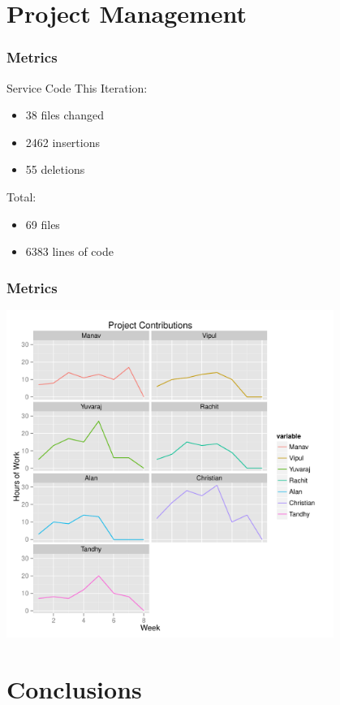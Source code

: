 \documentclass[final]{beamer}
\begin{document}
\section{Project Management}

\begin{frame}
	\frametitle{Metrics}
	\begin{beamerboxesrounded}[shadow]{Service Code}
		This Iteration:
		\begin{itemize}
			\item{38 files changed}
			\item{2462 insertions}
			\item{55 deletions}
		\end{itemize}

		Total:
		\begin{itemize}
			\item{69 files}
			\item{6383 lines of code}
		\end{itemize}
	\end{beamerboxesrounded}
\end{frame}

\begin{frame}
	\frametitle{Metrics}
	\includegraphics[width = 0.8\textwidth]{./hours_worked}
\end{frame}

\section{Conclusions}
\end{document}
